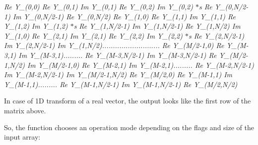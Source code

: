 {\itshape Re Y\+\_\+(0,0) Re Y\+\_\+(0,1) Im Y\+\_\+(0,1) Re Y\+\_\+(0,2) Im Y\+\_\+(0,2) $\ast$s Re Y\+\_\+(0,N/2-\/1) Im Y\+\_\+(0,N/2-\/1) Re Y\+\_\+(0,N/2) Re Y\+\_\+(1,0) Re Y\+\_\+(1,1) Im Y\+\_\+(1,1) Re Y\+\_\+(1,2) Im Y\+\_\+(1,2) $\ast$s Re Y\+\_\+(1,N/2-\/1) Im Y\+\_\+(1,N/2-\/1) Re Y\+\_\+(1,N/2) Im Y\+\_\+(1,0) Re Y\+\_\+(2,1) Im Y\+\_\+(2,1) Re Y\+\_\+(2,2) Im Y\+\_\+(2,2) $\ast$s Re Y\+\_\+(2,N/2-\/1) Im Y\+\_\+(2,N/2-\/1) Im Y\+\_\+(1,N/2)........................... Re Y\+\_\+(M/2-\/1,0) Re Y\+\_\+(M-\/3,1) Im Y\+\_\+(M-\/3,1)......... Re Y\+\_\+(M-\/3,N/2-\/1) Im Y\+\_\+(M-\/3,N/2-\/1) Re Y\+\_\+(M/2-\/1,N/2) Im Y\+\_\+(M/2-\/1,0) Re Y\+\_\+(M-\/2,1) Im Y\+\_\+(M-\/2,1)......... Re Y\+\_\+(M-\/2,N/2-\/1) Im Y\+\_\+(M-\/2,N/2-\/1) Im Y\+\_\+(M/2-\/1,N/2) Re Y\+\_\+(M/2,0) Re Y\+\_\+(M-\/1,1) Im Y\+\_\+(M-\/1,1)......... Re Y\+\_\+(M-\/1,N/2-\/1) Im Y\+\_\+(M-\/1,N/2-\/1) Re Y\+\_\+(M/2,N/2) }

In case of 1D transform of a real vector, the output looks like the first row of the matrix above.

So, the function chooses an operation mode depending on the flags and size of the input array\+:


